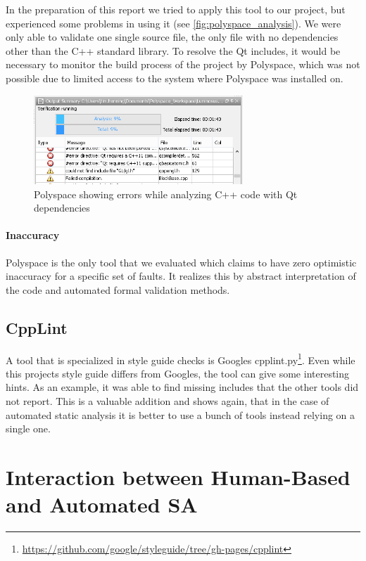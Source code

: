 \documentclass{scrreprt}
\begin{document}
In the preparation of this report we tried to apply this tool to our project, but experienced some problems in using it (see \vref{fig:polyspace_analysis}). We were only able to validate one single source file, the only file with no dependencies other than the C++ standard library. To resolve the Qt includes, it would be necessary to monitor the build process of the project by Polyspace, which was not possible due to limited access to the system where Polyspace was installed on.

\begin{figure}[h]
	\centering
	\includegraphics[width=0.7\textwidth]{img/polyspace_analysis}
	\caption[Polyspace Analysis]{Polyspace showing errors while analyzing C++ code with Qt dependencies}
	\label{fig:polyspace_analysis}
\end{figure}

\paragraph{Inaccuracy}

Polyspace is the only tool that we evaluated which claims to have zero optimistic inaccuracy for a specific set of faults. It realizes this by abstract interpretation of the code and automated formal validation methods.

\subsection{CppLint} 

A tool that is specialized in style guide checks is Googles cpplint.py\footnote{\url{https://github.com/google/styleguide/tree/gh-pages/cpplint}}. Even while this projects style guide differs from Googles, the tool can give some interesting hints. As an example, it was able to find missing includes that the other tools did not report. This is a valuable addition and shows again, that in the case of automated static analysis it is better to use a bunch of tools instead relying on a single one.

\section{Interaction between Human-Based and Automated SA}
\label{sec:humand-based-vs-automated-sa}
\end{document}
